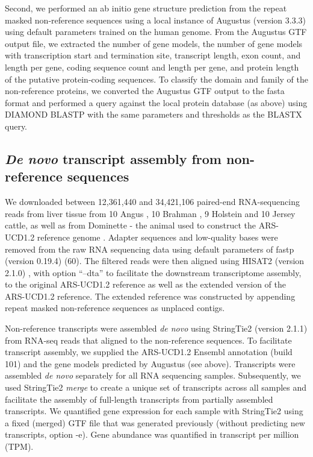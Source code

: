 \documentclass[../main.tex]{subfiles}
\begin{document}
Second, we performed an ab initio gene structure prediction from the repeat masked non-reference sequences using a local instance of Augustus (version 3.3.3) \citep{stanke2003gene} using default parameters trained on the human genome. From the Augustus GTF output file, we extracted the number of gene models, the number of gene models with transcription start and termination site, transcript length, exon count, and length per gene, coding sequence count and length per gene, and protein length of the putative protein-coding sequences. To classify the domain and family of the non-reference proteins, we converted the Augustus GTF output to the fasta format and performed a query against the local protein database (as above) using DIAMOND BLASTP with the same parameters and thresholds as the BLASTX query.

\subsection*{\emph{De novo} transcript assembly from non-reference sequences}

We downloaded between 12,361,440 and 34,421,106 paired-end RNA-sequencing reads from liver tissue from 10 Angus \citep{xiang2018genome}, 10 Brahman \citep{nguyen2016p1012}, 9 Holstein and 10 Jersey \citep{salleh2018gene} cattle, as well as from Dominette - the animal used to construct the ARS-UCD1.2 reference genome \citep{rosen2020novo}. Adapter sequences and low-quality bases were removed from the raw RNA sequencing data using default parameters of fastp (version 0.19.4) (60). The filtered reads were then aligned using HISAT2 (version 2.1.0) \citep{kim2019graph}, with option “--dta” to facilitate the downstream transcriptome assembly, to the original ARS-UCD1.2 reference as well as the extended version of the ARS-UCD1.2 reference. The extended reference was constructed by appending repeat masked non-reference sequences as unplaced \mbox{contigs.}  

Non-reference transcripts were assembled \emph{de novo} using StringTie2 (version 2.1.1) \citep{kovaka2019transcriptome} from RNA-seq reads that aligned to the non-reference sequences. To facilitate transcript assembly, we supplied the ARS-UCD1.2 Ensembl annotation (build 101) and the gene models predicted by Augustus (see above). Transcripts were assembled \emph{de novo} separately for all RNA sequencing samples. Subsequently, we used StringTie2 \emph{merge} to create a unique set of transcripts across all samples and facilitate the assembly of full-length transcripts from partially assembled transcripts. We quantified gene expression for each sample with StringTie2 using a fixed (merged) GTF file that was generated previously (without predicting new transcripts, option -e). Gene abundance was quantified in transcript per million (TPM).  
\end{document}
